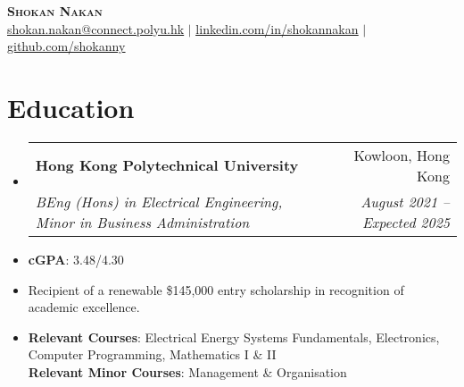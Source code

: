 \documentclass[letterpaper,11pt]{article}
\makeatletter
\newcommand{\resumeItem}[1]{
  \item\small{
    {#1 \vspace{-2pt}}
  }
}
\newcommand{\resumeSubheading}[4]{
  \vspace{-2pt}\item
    \begin{tabular*}{0.97\textwidth}[t]{l@{\extracolsep{\fill}}r}
      \textbf{#1} & #2 \\
      \textit{\small#3} & \textit{\small #4} \\
    \end{tabular*}\vspace{-7pt}
}
\newcommand{\resumeSubHeadingListStart}{\begin{itemize}[leftmargin=0.15in, label={}]}
\newcommand{\resumeSubHeadingListEnd}{\end{itemize}}
\makeatother
\begin{document}

\begin{center}
    \textbf{\Huge \scshape Shokan Nakan} \\ \vspace{1pt}
    \small  \href{mailto:shokan.nakan@connect.polyu.hk}{\underline{shokan.nakan@connect.polyu.hk}} $|$ 
    \href{https://linkedin.com/in/shokannakan}{\underline{linkedin.com/in/shokannakan}} $|$
    \href{https://github.com/shokanny}{\underline{github.com/shokanny}}
\end{center}


\section{Education}
  \resumeSubHeadingListStart
    \resumeSubheading
      {Hong Kong Polytechnical University}{Kowloon, Hong Kong}
      {BEng (Hons) in Electrical Engineering, Minor in Business Administration}{August 2021 -- Expected 2025}
      \resumeItem{\textbf{cGPA}: 3.48/4.30}
      \resumeItem{Recipient of a renewable \$145,000 entry scholarship in recognition of academic excellence.}
      \resumeItem{\textbf{Relevant Courses}: Electrical Energy Systems Fundamentals, Electronics, Computer Programming, Mathematics I \& II \\ \textbf{Relevant Minor Courses}: Management \& Organisation}
      
  \resumeSubHeadingListEnd


\end{document}
